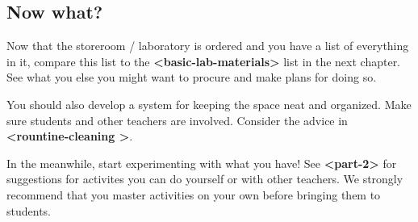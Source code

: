 \documentclass{report}
\begin{document}
\subsection{Now what?}

Now that the storeroom / laboratory is ordered and you have a list of everything in it, compare this list to the \textbf{\textless basic-lab-materials\textgreater } list in the next chapter. See what you else you might want to procure and make plans for doing so.

You should also develop a system for keeping the space neat and organized. Make sure students and other teachers are involved. Consider the advice in \textbf{\textless rountine-cleaning \textgreater}.

In the meanwhile, start experimenting with what you have! See \textbf{\textless part-2\textgreater } for suggestions for activites you can do yourself or with other teachers. We strongly recommend that you master activities on your own before bringing them to students.
\end{document}
